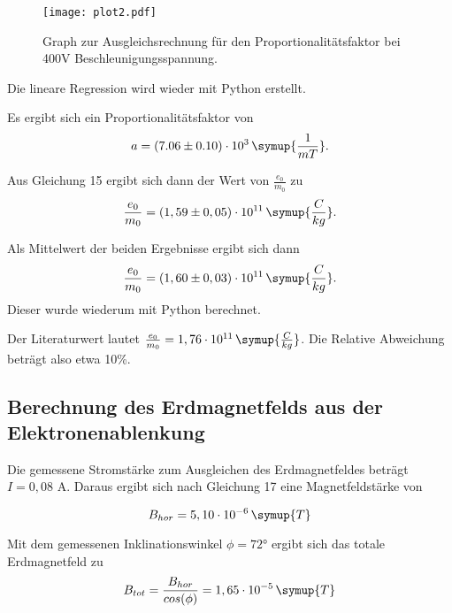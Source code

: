 \begin{figure}[H]
  \centering
  \texttt{[image: plot2.pdf]}
  \caption{Graph zur Ausgleichsrechnung für den Proportionalitätsfaktor bei 400V Beschleunigungsspannung.}
  \label{fig:plot222}
\end{figure}

Die lineare Regression wird wieder mit Python erstellt.

Es ergibt sich ein Proportionalitätsfaktor von
\begin{equation*}
  a = (7.06 \pm 0.10)\cdot 10^3\, \symup{\frac{1}{mT}}.
\end{equation*}

Aus Gleichung 15 ergibt sich dann der Wert von $\frac{e_0}{m_0}$ zu
\begin{equation*}
  \frac{e_0}{m_0} = (1,59 \pm 0,05)\cdot 10^{11} \, \symup{\frac{C}{kg}}.
\end{equation*}

Als Mittelwert der beiden Ergebnisse ergibt sich dann
\begin{equation*}
  \frac{e_0}{m_0} = (1,60 \pm 0,03)\cdot 10^{11} \, \symup{\frac{C}{kg}}.
\end{equation*}
Dieser wurde wiederum mit Python berechnet.

Der Literaturwert lautet $\frac{e_0}{m_0} = 1,76 \cdot 10^{11} \, \symup{\frac{C}{kg}}$.
Die Relative Abweichung beträgt also etwa 10\%.

\subsection{Berechnung des Erdmagnetfelds aus der Elektronenablenkung}

Die gemessene Stromstärke zum Ausgleichen des Erdmagnetfeldes beträgt $I = 0,08$ A.
Daraus ergibt sich nach Gleichung 17 eine Magnetfeldstärke von

\begin{equation*}
  B_{hor} = 5,10 \cdot 10^{-6} \, \symup{T}
\end{equation*}

Mit dem gemessenen Inklinationswinkel $\phi = 72°$ ergibt sich das totale
Erdmagnetfeld zu
\begin{equation*}
  B_{tot} = \frac{B_{hor}}{cos(\phi)} = 1,65 \cdot 10^{-5} \, \symup{T}
\end{equation*}
